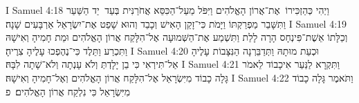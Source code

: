 I Samuel 4:18	וַיְהִי כְּהַזְכִּירוֹ  אֶת־אֲרוֹן הָאֱלֹהִים וַיִּפֹּל מֵעַל־הַכִּסֵּא אֲחֹרַנִּית בְּעַד  יַד הַשַּׁעַר וַתִּשָּׁבֵר מַפְרַקְתּוֹ וַיָּמֹת כִּי־זָקֵן הָאִישׁ וְכָבֵד וְהוּא שָׁפַט אֶת־יִשְׂרָאֵל אַרְבָּעִים שָׁנָה׃
I Samuel 4:19	וְכַלָּתוֹ אֵשֶׁת־פִּינְחָס הָרָה לָלַת וַתִּשְׁמַע אֶת־הַשְּׁמוּעָה אֶל־הִלָּקַח אֲרוֹן הָאֱלֹהִים וּמֵת חָמִיהָ וְאִישָׁהּ וַתִּכְרַע וַתֵּלֶד כִּי־נֶהֶפְכוּ עָלֶיהָ צִרֶיהָ׃
I Samuel 4:20	וּכְעֵת מוּתָהּ וַתְּדַבֵּרְנָה הַנִּצָּבוֹת עָלֶיהָ אַל־תִּירְאִי כִּי בֵן יָלָדְתְּ וְלֹא עָנְתָה וְלֹא־שָׁתָה לִבָּהּ׃
I Samuel 4:21	וַתִּקְרָא לַנַּעַר אִיכָבוֹד לֵאמֹר גָּלָה כָבוֹד מִיִּשְׂרָאֵל אֶל־הִלָּקַח אֲרוֹן הָאֱלֹהִים וְאֶל־חָמִיהָ וְאִישָׁהּ׃
I Samuel 4:22	וַתֹּאמֶר גָּלָה כָבוֹד מִיִּשְׂרָאֵל כִּי נִלְקַח אֲרוֹן הָאֱלֹהִים׃ {פ}
